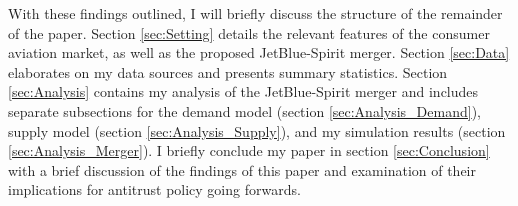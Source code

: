 \documentclass{article}
\begin{document}

    With these findings outlined, I will briefly discuss the structure of the remainder of the paper. Section \ref{sec:Setting} details the relevant features of the consumer aviation market, as well as the proposed JetBlue-Spirit merger. Section \ref{sec:Data} elaborates on my data sources and presents summary statistics. Section \ref{sec:Analysis} contains my analysis of the JetBlue-Spirit merger and includes separate subsections for the demand model (section \ref{sec:Analysis_Demand}), supply model (section \ref{sec:Analysis_Supply}), and my simulation results (section \ref{sec:Analysis_Merger}).  I briefly conclude my paper in section \ref{sec:Conclusion} with a brief discussion of the findings of this paper and examination of their implications for antitrust policy going forwards. 

    
    \pagebreak 
	 
	
\end{document}

